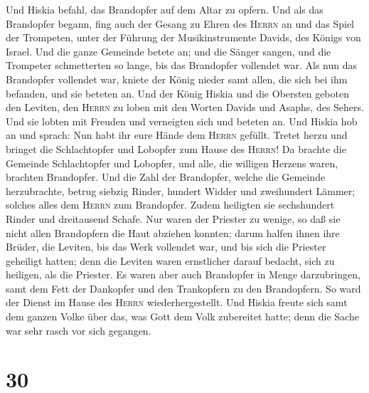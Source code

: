  Und Hiskia befahl, das Brandopfer auf dem Altar zu
opfern. Und als das Brandopfer begann, fing auch der Gesang zu Ehren des
\textsc{Herrn} an und das Spiel der Trompeten, unter der Führung der
Musikinstrumente Davids, des Königs von Israel.  Und die
ganze Gemeinde betete an; und die Sänger sangen, und die Trompeter
schmetterten so lange, bis das Brandopfer vollendet war. 
Als nun das Brandopfer vollendet war, kniete der König nieder samt
allen, die sich bei ihm befanden, und sie beteten an. 
Und der König Hiskia und die Obersten geboten den Leviten, den
\textsc{Herrn} zu loben mit den Worten Davids und Asaphs, des Sehers.
Und sie lobten mit Freuden und verneigten sich und beteten an.
 Und Hiskia hob an und sprach: Nun habt ihr eure Hände
dem \textsc{Herrn} gefüllt. Tretet herzu und bringet die Schlachtopfer
und Lobopfer zum Hause des \textsc{Herrn}! Da brachte die Gemeinde
Schlachtopfer und Lobopfer, und alle, die willigen Herzens waren,
brachten Brandopfer.  Und die Zahl der Brandopfer, welche
die Gemeinde herzubrachte, betrug siebzig Rinder, hundert Widder und
zweihundert Lämmer; solches alles dem \textsc{Herrn} zum Brandopfer.
 Zudem heiligten sie sechshundert Rinder und dreitausend
Schafe.  Nur waren der Priester zu wenige, so daß sie
nicht allen Brandopfern die Haut abziehen konnten; darum halfen ihnen
ihre Brüder, die Leviten, bis das Werk vollendet war, und bis sich die
Priester geheiligt hatten; denn die Leviten waren ernstlicher darauf
bedacht, sich zu heiligen, als die Priester.  Es waren
aber auch Brandopfer in Menge darzubringen, samt dem Fett der Dankopfer
und den Trankopfern zu den Brandopfern. So ward der Dienst im Hause des
\textsc{Herrn} wiederhergestellt.  Und Hiskia freute sich
samt dem ganzen Volke über das, was Gott dem Volk zubereitet hatte; denn
die Sache war sehr rasch vor sich gegangen.

\hypertarget{section-29}{%
\section{30}\label{section-29}}

